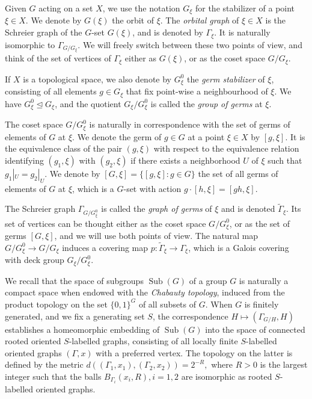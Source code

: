 \documentclass[11pt]{amsart}
\newcommand{\sub}{\ensuremath{\operatorname{Sub}}}%
\newcommand{\Gammatilde}{\ensuremath{\widetilde{\Gamma}}}%
\theoremstyle{definition}
\theoremstyle{plain}
\newtheorem{main thm}{Theorem}
\theoremstyle{remark}
\theoremstyle{plain}
\begin{document}
Given $G$ acting on a set $X$, we use the notation $G_\xi$ for the stabilizer of a point  $\xi\in X$. 	We denote by $G(\xi)$ the orbit of $\xi$.	The \emph{orbital graph} of $\xi\in X$ is the Schreier graph of the $G$-set $G(
\xi)$, and is denoted by $\Gamma_\xi$. It is naturally isomorphic to $\Gamma_{G/G_
\xi}$. We will freely switch between these two points of view,  and think of the set of vertices of $\Gamma_\xi$ either as $G(
\xi)$, or as the coset space $G/G_\xi$.

If $X$ is a topological space, we also denote by  $G^0_\xi$ the \emph{germ stabilizer} of $\xi$, consisting of all elements $g\in G_\xi$ that fix point-wise a neighbourhood of $\xi$.  We have $G^0_\xi\unlhd G_\xi$, and the quotient $G_\xi/G^0_\xi$ is called the \emph{group of germs} at $\xi$. 

The coset space $G/G^0_\xi$ is naturally in correspondence with the set of {germs} of elements of $G$ at $\xi$. We denote the germ of $g\in G$ at a point $\xi\in X$ by $[g, \xi]$. It is the equivalence class of the pair $(g, \xi)$ with respect to the equivalence relation identifying $(g_1, \xi)$ with $(g_2, \xi)$ if there exists a neighborhood $U$ of $\xi$ such that $g_1|_U=g_2|_U$. We denote by $[G, \xi]=\{[g, \xi] \colon g\in G\}$ the set of all germs of elements of $G$ at $\xi$, which is a $G$-set with action $g\cdot [h, \xi]=[gh, \xi]$.
		
	The  Schreier graph $\Gamma_{G/G^0_\xi}$ is called the \emph{graph of germs} of $\xi$ and is denoted $\widetilde{\Gamma}_\xi$. Its set of vertices can be thought either as the coset space $G/G^0_\xi$, or as the set of germs $[G, \xi]$, and we will use both points of view. The natural map $G/G^0_\xi\to G/G_\xi$ induces a covering map $p\colon \Gammatilde_\xi\to \Gamma_\xi$,
which is a Galois covering with deck group $G_\xi/G^0_\xi$. 


We recall that the space of subgroups $\sub(G)$ of a group $G$ is naturally a compact space when endowed with the \emph{Chabauty topology}, induced from the product topology on the set $\{0, 1\}^G$ of all subsets of $G$. When $G$ is finitely generated, and we fix a generating set $S$, the correspondence $H\mapsto (\Gamma_{G/H}, H)$ establishes a homeomorphic embedding of $\sub(G)$ into the space of  connected {rooted oriented $S$-labelled graphs}, consisting of all locally finite $S$-labelled oriented graphs $(\Gamma, x)$ with a preferred vertex.  The topology on the latter is defined by the metric $d((\Gamma_1, x_1),(\Gamma_2, x_2))=2^{-R},$ where $R>0$ is the largest integer such that the balls $B_{\Gamma_i}(x_i, R), i=1, 2$ are isomorphic as rooted $S$-labelled oriented graphs. 
\end{document}
